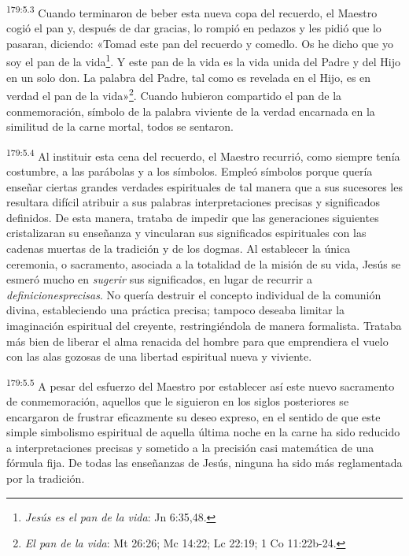 \par
\textsuperscript{179:5.3} Cuando terminaron de beber esta nueva copa del recuerdo, el Maestro cogió el pan y, después de dar gracias, lo rompió en pedazos y les pidió que lo pasaran, diciendo: «Tomad este pan del recuerdo y comedlo. Os he dicho que yo soy el pan de la vida\footnote{\textit{Jesús es el pan de la vida}: Jn 6:35,48.}. Y este pan de la vida es la vida unida del Padre y del Hijo en un solo don. La palabra del Padre, tal como es revelada en el Hijo, es en verdad el pan de la vida»\footnote{\textit{El pan de la vida}: Mt 26:26; Mc 14:22; Lc 22:19; 1 Co 11:22b-24.}. Cuando hubieron compartido el pan de la conmemoración, símbolo de la palabra viviente de la verdad encarnada en la similitud de la carne mortal, todos se sentaron.

\par
\textsuperscript{179:5.4} Al instituir esta cena del recuerdo, el Maestro recurrió, como siempre tenía costumbre, a las parábolas y a los símbolos. Empleó símbolos porque quería enseñar ciertas grandes verdades espirituales de tal manera que a sus sucesores les resultara difícil atribuir a sus palabras interpretaciones precisas y significados definidos. De esta manera, trataba de impedir que las generaciones siguientes cristalizaran su enseñanza y vincularan sus significados espirituales con las cadenas muertas de la tradición y de los dogmas. Al establecer la única ceremonia, o sacramento, asociada a la totalidad de la misión de su vida, Jesús se esmeró mucho en \textit{sugerir} sus significados, en lugar de recurrir a \textit{definicionesprecisas}. No quería destruir el concepto individual de la comunión divina, estableciendo una práctica precisa; tampoco deseaba limitar la imaginación espiritual del creyente, restringiéndola de manera formalista. Trataba más bien de liberar el alma renacida del hombre para que emprendiera el vuelo con las alas gozosas de una libertad espiritual nueva y viviente.

\par
\textsuperscript{179:5.5} A pesar del esfuerzo del Maestro por establecer así este nuevo sacramento de conmemoración, aquellos que le siguieron en los siglos posteriores se encargaron de frustrar eficazmente su deseo expreso, en el sentido de que este simple simbolismo espiritual de aquella última noche en la carne ha sido reducido a interpretaciones precisas y sometido a la precisión casi matemática de una fórmula fija. De todas las enseñanzas de Jesús, ninguna ha sido más reglamentada por la tradición.

